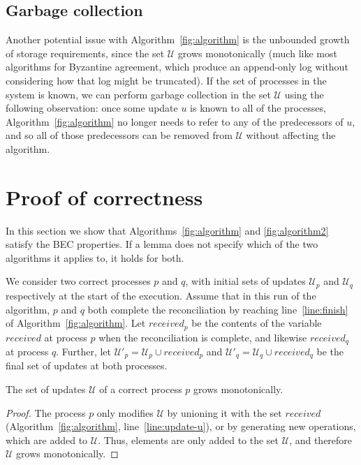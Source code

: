 \documentclass[a4paper,anonymous,USenglish]{lipics-v2019}
\begin{document}
\subsection{Garbage collection}

Another potential issue with Algorithm~\ref{fig:algorithm} is the unbounded growth of storage requirements, since the set $\mathcal{U}$ grows monotonically (much like most algorithms for Byzantine agreement, which produce an append-only log without considering how that log might be truncated).
If the set of processes in the system is known, we can perform garbage collection in the set $\mathcal{U}$ using the following observation: once some update $u$ is known to all of the processes, Algorithm~\ref{fig:algorithm} no longer needs to refer to any of the predecessors of $u$, and so all of those predecessors can be removed from $\mathcal{U}$ without affecting the algorithm.

\section{Proof of correctness}\label{sec:proof}

In this section we show that Algorithms~\ref{fig:algorithm} and \ref{fig:algorithm2} satisfy the BEC properties.
If a lemma does not specify which of the two algorithms it applies to, it holds for both.

We consider two correct processes $p$ and $q$, with initial sets of updates $\mathcal{U}_p$ and $\mathcal{U}_q$ respectively at the start of the execution.
Assume that in this run of the algorithm, $p$ and $q$ both complete the reconciliation by reaching line~\ref{line:finish} of Algorithm~\ref{fig:algorithm}.
Let $\mathit{received}_p$ be the contents of the variable $\mathit{received}$ at process $p$ when the reconciliation is complete, and likewise $\mathit{received}_q$ at process $q$.
Further, let $\mathcal{U}'_p = \mathcal{U}_p \cup \mathit{received}_p$ and $\mathcal{U}'_q = \mathcal{U}_q \cup \mathit{received}_q$ be the final set of updates at both processes.

\begin{lemma}\label{lemma:no-p-missing}
The set of updates $\mathcal{U}$ of a correct process $p$ grows monotonically.
\end{lemma}
\begin{proof}
The process $p$ only modifies $\mathcal{U}$ by unioning it with the set $\mathit{received}$ (Algorithm~\ref{fig:algorithm}, line~\ref{line:update-u}), or by generating new operations, which are added to $\mathcal{U}$.
Thus, elements are only added to the set $\mathcal{U}$, and therefore $\mathcal{U}$ grows monotonically.
\end{proof}
\end{document}
